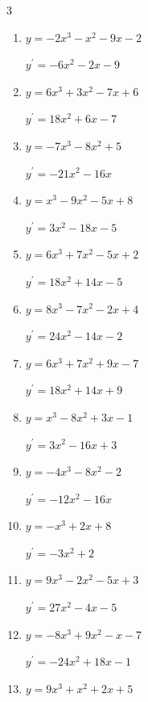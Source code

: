 \begin{multicols}{3}
\begin{enumerate}
        $\displaystyle y^{\prime}=3x^{2}+10x+2$

  \item $y=-2x^{3}-x^{2}-9x-2$

        $\displaystyle y^{\prime}=-6x^{2}-2x-9$

  \item $y=6x^{3}+3x^{2}-7x+6$

        $\displaystyle y^{\prime}=18x^{2}+6x-7$

\columnbreak %

  \item $y=-7x^{3}-8x^{2}+5$

        $\displaystyle y^{\prime}=-21x^{2}-16x$

  \item $y=x^{3}-9x^{2}-5x+8$

        $\displaystyle y^{\prime}=3x^{2}-18x-5$

  \item $y=6x^{3}+7x^{2}-5x+2$

        $\displaystyle y^{\prime}=18x^{2}+14x-5$

  \item $y=8x^{3}-7x^{2}-2x+4$

        $\displaystyle y^{\prime}=24x^{2}-14x-2$

  \item $y=6x^{3}+7x^{2}+9x-7$

        $\displaystyle y^{\prime}=18x^{2}+14x+9$

  \item $y=x^{3}-8x^{2}+3x-1$

        $\displaystyle y^{\prime}=3x^{2}-16x+3$

  \item $y=-4x^{3}-8x^{2}-2$

        $\displaystyle y^{\prime}=-12x^{2}-16x$

  \item $y=-x^{3}+2x+8$

        $\displaystyle y^{\prime}=-3x^{2}+2$

  \item $y=9x^{3}-2x^{2}-5x+3$

        $\displaystyle y^{\prime}=27x^{2}-4x-5$

  \item $y=-8x^{3}+9x^{2}-x-7$

        $\displaystyle y^{\prime}=-24x^{2}+18x-1$

  \item $y=9x^{3}+x^{2}+2x+5$


\end{enumerate}
\end{multicols}
